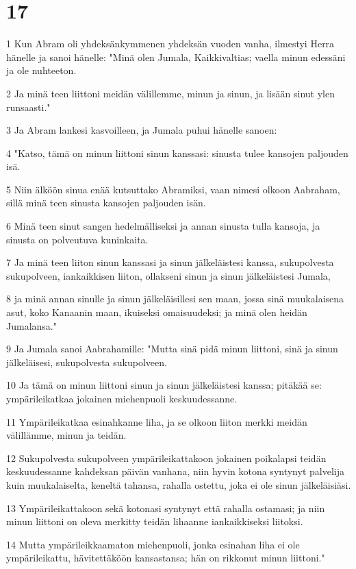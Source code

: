 \chapter{17}

\par 1 Kun Abram oli yhdeksänkymmenen yhdeksän vuoden vanha, ilmestyi Herra hänelle ja sanoi hänelle: "Minä olen Jumala, Kaikkivaltias; vaella minun edessäni ja ole nuhteeton.
\par 2 Ja minä teen liittoni meidän välillemme, minun ja sinun, ja lisään sinut ylen runsaasti."
\par 3 Ja Abram lankesi kasvoilleen, ja Jumala puhui hänelle sanoen:
\par 4 "Katso, tämä on minun liittoni sinun kanssasi: sinusta tulee kansojen paljouden isä.
\par 5 Niin älköön sinua enää kutsuttako Abramiksi, vaan nimesi olkoon Aabraham, sillä minä teen sinusta kansojen paljouden isän.
\par 6 Minä teen sinut sangen hedelmälliseksi ja annan sinusta tulla kansoja, ja sinusta on polveutuva kuninkaita.
\par 7 Ja minä teen liiton sinun kanssasi ja sinun jälkeläistesi kanssa, sukupolvesta sukupolveen, iankaikkisen liiton, ollakseni sinun ja sinun jälkeläistesi Jumala,
\par 8 ja minä annan sinulle ja sinun jälkeläisillesi sen maan, jossa sinä muukalaisena asut, koko Kanaanin maan, ikuiseksi omaisuudeksi; ja minä olen heidän Jumalansa."
\par 9 Ja Jumala sanoi Aabrahamille: "Mutta sinä pidä minun liittoni, sinä ja sinun jälkeläisesi, sukupolvesta sukupolveen.
\par 10 Ja tämä on minun liittoni sinun ja sinun jälkeläistesi kanssa; pitäkää se: ympärileikatkaa jokainen miehenpuoli keskuudessanne.
\par 11 Ympärileikatkaa esinahkanne liha, ja se olkoon liiton merkki meidän välillämme, minun ja teidän.
\par 12 Sukupolvesta sukupolveen ympärileikattakoon jokainen poikalapsi teidän keskuudessanne kahdeksan päivän vanhana, niin hyvin kotona syntynyt palvelija kuin muukalaiselta, keneltä tahansa, rahalla ostettu, joka ei ole sinun jälkeläisiäsi.
\par 13 Ympärileikattakoon sekä kotonasi syntynyt että rahalla ostamasi; ja niin minun liittoni on oleva merkitty teidän lihaanne iankaikkiseksi liitoksi.
\par 14 Mutta ympärileikkaamaton miehenpuoli, jonka esinahan liha ei ole ympärileikattu, hävitettäköön kansastansa; hän on rikkonut minun liittoni."

